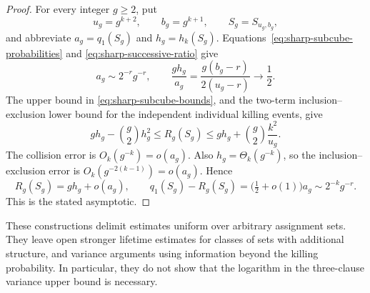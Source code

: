 \begin{proof}
For every integer \(g\ge2\), put
\[
 u_g=g^{k+2},\qquad b_g=g^{k+1},\qquad S_g=S_{u_g,b_g},
\]
and abbreviate \(a_g=q_1(S_g)\) and \(h_g=h_k(S_g)\).
Equations~\eqref{eq:sharp-subcube-probabilities} and
\eqref{eq:sharp-successive-ratio} give
\[
 a_g\sim2^{-r}g^{-r},\qquad
 \frac{gh_g}{a_g}=\frac{g(b_g-r)}{2(u_g-r)}
 \longrightarrow\frac12.
\]
The upper bound in \eqref{eq:sharp-subcube-bounds}, and the two-term
inclusion--exclusion lower bound for the independent individual killing
events, give
\[
 gh_g-\binom g2h_g^2
 \le R_g(S_g)
 \le gh_g+\binom g2\frac{k^2}{u_g}.
\]
The collision error is \(O_k(g^{-k})=o(a_g)\).  Also
\(h_g=\Theta_k(g^{-k})\), so the inclusion--exclusion error is
\(O_k(g^{-2(k-1)})=o(a_g)\).  Hence
\[
 R_g(S_g)=gh_g+o(a_g),\qquad
 q_1(S_g)-R_g(S_g)
   =\bigl(\tfrac12+o(1)\bigr)a_g
   \sim2^{-k}g^{-r}.
\]
This is the stated asymptotic.
\end{proof}

These constructions delimit estimates uniform over arbitrary assignment
sets.  They leave open stronger lifetime estimates for classes of sets
with additional structure, and variance arguments using information
beyond the killing probability.  In particular, they do not show that
the logarithm in the three-clause variance upper bound is necessary.
